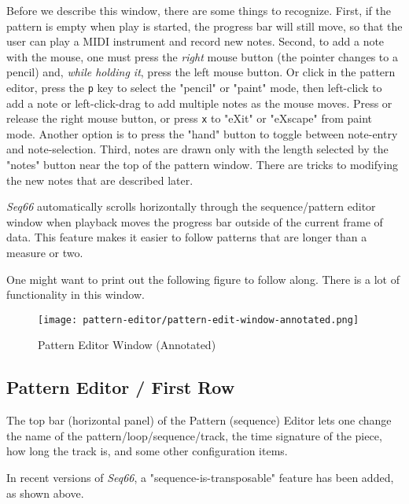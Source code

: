    Before we describe this window, there are some things to recognize.
   First, if the pattern is empty when play is started, the progress bar will
   still move, so that the user can play a MIDI instrument and record new notes.
   Second, to add a note with the mouse, one must press the \textsl{right}
   mouse button (the pointer changes to a pencil) and,
   \textsl{while holding it}, press the left mouse button.
   Or click in the pattern editor, press the
   \texttt{p} key to select the "pencil" or "paint" mode, then
   left-click to add a note or
   left-click-drag to add multiple notes as the mouse moves.
   Press or release the right mouse button, or press
   \texttt{x} to "eXit" or "eXscape" from paint mode.
   Another option is to press the "hand" button to toggle between note-entry
   and note-selection.
   Third, notes are drawn only with the length selected by the "notes" button
   near the top of the pattern window.  There are tricks to
   modifying the new notes that are described later.

   \textsl{Seq66} automatically scrolls
   horizontally through the sequence/pattern editor window when
   playback moves the progress bar outside of the current frame of data.  This
   feature makes it easier to follow patterns that are longer than a measure or
   two.

   One might want to print out the following figure to follow along.  There is
   a lot of functionality in this window.

\begin{figure}[H]
   \centering 
   \texttt{[image: pattern-editor/pattern-edit-window-annotated.png]}
   \caption{Pattern Editor Window (Annotated)}
   \label{fig:pattern_editor_window_annotated}
\end{figure}

\subsection{Pattern Editor / First Row}
\label{subsec:pattern_editor_first_row}

   The top bar (horizontal panel) of the Pattern (sequence) Editor
   lets one change the name of
   the pattern/loop/sequence/track, the time signature of the piece, how long
   the track is, and some other configuration items.

   In recent versions of \textsl{Seq66}, a "sequence-is-transposable"
   feature has been added, as shown above.


